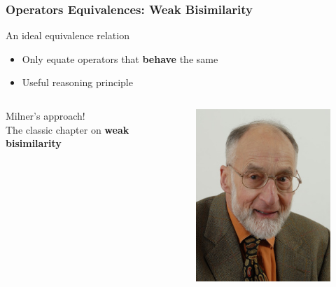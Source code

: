 \documentclass[fleqn,aspectratio=169,10pt]{beamer}
\begin{document}
\begin{frame}[fragile]
  \frametitle{Operators Equivalences: Weak Bisimilarity}
  \begin{block}{An ideal equivalence relation}
    \begin{itemize}
      \item Only equate operators that \textbf{behave} the same
      \item Useful reasoning principle
    \end{itemize}
  \end{block}
  \pause
  \begin{itemize}

          \begin{columns}
            \begin{column}{.42\textwidth}
              \item Milner's approach!\\ The classic chapter on \textbf{weak bisimilarity}
            \end{column}
            \begin{column}{.1\textwidth}
              \begin{figure}
                \includegraphics[width=1\textwidth]{milner.jpg}

\end{figure}
\end{column}
\end{columns}
\end{itemize}
\end{frame}
\end{document}
